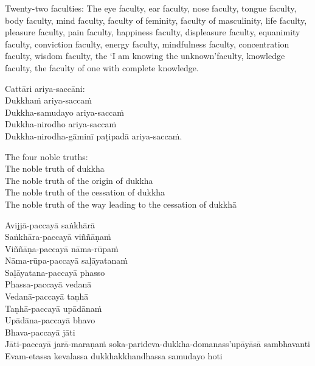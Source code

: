\begin{english-hang-verses}
  Twenty-two faculties: The eye faculty, ear faculty, nose faculty, tongue faculty, body faculty, mind faculty, faculty of feminity, faculty of masculinity, life faculty, pleasure faculty, pain faculty, happiness faculty, displeasure faculty, equanimity faculty, conviction faculty, energy faculty, mindfulness faculty, concentration faculty, wisdom faculty, the `I am knowing the unknown'faculty, knowledge faculty, the faculty of one with complete knowledge.
\end{english-hang-verses}

\suttaRef{[Vibh]}

\begin{pali-hang-continued}
Cattāri ariya-saccāni:\\
Dukkhaṁ ariya-saccaṁ\\
Dukkha-samudayo ariya-saccaṁ\\
Dukkha-nirodho ariya-saccaṁ\\
Dukkha-nirodha-gāminī paṭipadā ariya-saccaṁ.
\end{pali-hang-continued}

\begin{english-hang-verses}
  The four noble truths:\\
  The noble truth of dukkha\\
  The noble truth of the origin of dukkha\\
  The noble truth of the cessation of dukkha\\
  The noble truth of the way leading to the cessation of dukkhā
\end{english-hang-verses}

\suttaRef{[SN 56.24]}

\begin{pali-hang-continued}
Avijjā-paccayā saṅkhārā\\
Saṅkhāra-paccayā viññāṇaṁ\\
Viññāṇa-paccayā nāma-rūpaṁ\\
Nāma-rūpa-paccayā saḷāyatanaṁ\\
Saḷāyatana-paccayā phasso\\
Phassa-paccayā vedanā\\
Vedanā-paccayā taṇhā\\
Taṇhā-paccayā upādānaṁ\\
Upādāna-paccayā bhavo\\
Bhava-paccayā jāti\\
Jāti-paccayā jarā-maraṇaṁ soka-parideva-dukkha-domanass'upāyāsā sambhavanti\\
Evam-etassa kevalassa dukkhakkhandhassa samudayo hoti
\end{pali-hang-continued}

